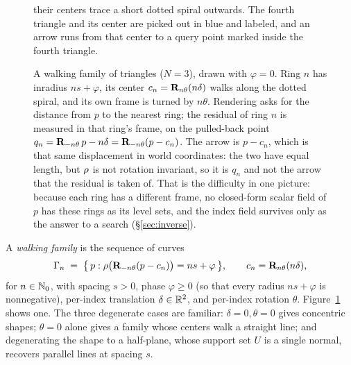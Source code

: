 \begin{figure}[t]
{  their centers trace a short dotted spiral outwards. The fourth triangle and its
  center are picked out in blue and labeled, and an arrow runs from that center to a
  query point marked inside the fourth triangle.}
  \caption{A walking family of triangles ($N=3$), drawn with $\varphi=0$. Ring $n$
  has inradius $ns+\varphi$, its center $c_n = \mathbf{R}_{n\theta}(n\delta)$ walks along
  the dotted spiral, and its own frame is turned by $n\theta$. Rendering asks for
  the distance from $p$ to the nearest ring; the residual of ring $n$ is measured
  in that ring's frame, on the pulled-back point
  $q_n = \mathbf{R}_{-n\theta}\,p - n\delta = \mathbf{R}_{-n\theta}(p - c_n)$. The arrow is
  $p-c_n$, which is that same displacement in world coordinates: the two have equal
  length, but $\rho$ is not rotation invariant, so it is $q_n$ and not the arrow
  that the residual is taken of. That is the difficulty in one picture: because
  each ring has a different frame, no closed-form scalar field of $p$ has these
  rings as its level sets, and the index field survives only as the answer to a
  search (\S\ref{sec:inverse}).}
  \label{fig:family}
\end{figure}

A \emph{walking family} is the sequence of curves
\begin{equation}
  \Gamma_n \;=\; \bigl\{\, p : \rho\bigl(\mathbf{R}_{-n\theta}(p - c_n)\bigr) = ns+\varphi \,\bigr\},
  \qquad c_n = \mathbf{R}_{n\theta}(n\delta),
  \label{eq:family}
\end{equation}
for $n\in\mathbb{N}_0$, with spacing $s>0$, phase $\varphi\ge0$ (so that every radius
$ns+\varphi$ is nonnegative), per-index translation
$\delta\in\mathbb{R}^2$, and per-index rotation $\theta$. Figure~\ref{fig:family} shows
one. The three degenerate cases are familiar: $\delta=0,\theta=0$ gives
concentric shapes; $\theta=0$ alone gives a family whose centers walk a straight
line; and degenerating the shape to a half-plane, whose support set $U$ is a
single normal, recovers parallel lines at spacing $s$.

